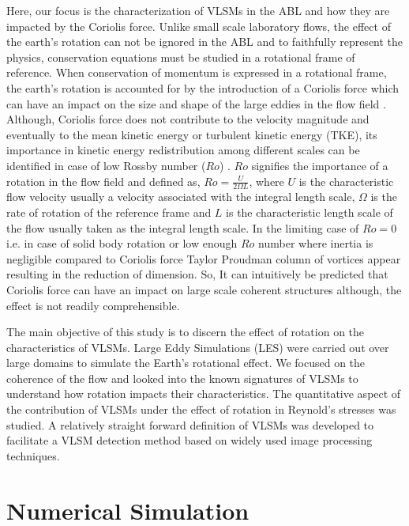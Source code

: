 \documentclass{amsart}
\begin{document}
Here, our focus is the characterization of VLSMs in the ABL and how they are impacted by the Coriolis force. Unlike small scale laboratory flows, the effect of the earth's rotation can not be ignored in the ABL and to faithfully represent the physics, conservation equations must be studied in a rotational frame of reference.  When conservation of momentum is expressed in a rotational frame, the earth's rotation is accounted for by the introduction of a Coriolis force which can have an impact on the size and shape of the large eddies in the flow field \citep{esau_jot_2002}. Although, Coriolis force does not contribute to the velocity magnitude and eventually to the mean kinetic energy or turbulent kinetic energy (TKE), its importance in kinetic energy redistribution among different scales can be identified in case of low Rossby number ($Ro$) \citep{yeung_zhou_pof_98,hossain_pof_94}. $Ro$ signifies the  importance of a rotation in the flow field and defined as,  $Ro=\frac{U}{2\Omega L}$, where $U$ is the characteristic flow velocity usually a velocity associated with the integral length scale, $\Omega$ is the rate of rotation of the reference frame and $L$ is the characteristic length scale of the flow usually taken as the integral length scale. In the limiting case of $Ro=0$  i.e. in case of solid body rotation or low enough $Ro$ number where inertia is negligible compared to Coriolis force Taylor Proudman column of vortices appear resulting in the reduction of dimension. So, It can  intuitively be predicted that Coriolis force  can have an impact on large scale coherent structures although, the effect is not readily comprehensible.   

The main objective of this study is to discern the effect of rotation on the characteristics of VLSMs.  Large Eddy Simulations (LES) were carried out over large domains to simulate the Earth's rotational effect.  We focused on the coherence of the flow and looked into the  known  signatures of VLSMs to understand how rotation impacts their characteristics.  The quantitative aspect of the contribution of VLSMs under the effect of rotation in Reynold's stresses was studied.  A relatively straight forward  definition of VLSMs was developed to facilitate a VLSM detection method based on widely used image processing techniques. 

\section{Numerical Simulation}
\end{document}
